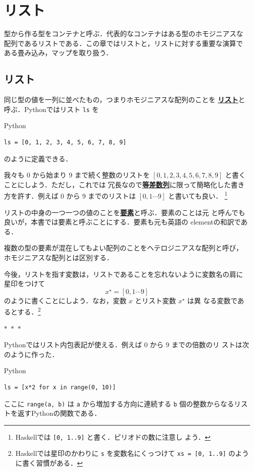 \documentclass[a5paper,twoside,fleqn,draft]{jsbook}
\newcommand{\separator}{\begin{center}$*$~$*$~$*$\end{center}}
\newcommand{\programminglanguage}[1]{\textsf{#1}}
\newcommand{\haskell}{\programminglanguage{Haskell}}
\newcommand{\python}{\programminglanguage{Python}}
\newenvironment{leader}{\begingroup\gt}{\endgroup}
\newcommand{\keyword}[1]{{\underline{\textbf{#1}}}}
\newcommand{\code}[1]{\texttt{#1}}
\newenvironment{pythoncode}{\begin{itembox}[r]{\python}}{\end{itembox}}
\newcommand{\mListWith}[1]{\left[#1\right]}
\newcommand{\mList}[1]{{#1}^\mathrm{\star}}
\begin{document}
\chapter{リスト}
\label{ch:list}

\begin{leader}
型から作る型をコンテナと呼ぶ．代表的なコンテナはある型のホモジニアスな
配列であるリストである．この章ではリストと，リストに対する重要な演算で
ある畳み込み，マップを取り扱う．
\end{leader}


\section{リスト}

同じ型の値を一列に並べたもの，つまりホモジニアスな配列のことを
\keyword{リスト}と呼ぶ．\python ではリスト \code{ls} を
\begin{pythoncode}
\begin{verbatim}
ls = [0, 1, 2, 3, 4, 5, 6, 7, 8, 9]
\end{verbatim}
\end{pythoncode}
のように定義できる．

我々も $0$ から始まり $9$ まで続く整数のリストを
$\mListWith{0,1,2,3,4,5,6,7,8,9}$ と書くことにしよう．ただし，これでは
冗長なので\keyword{等差数列}に限って簡略化した書き方を許す．例えば $0$
から $9$ までのリストは $\mListWith{0,1\dotsb9}$ と書いても良い．
\footnote{\haskell では \code{[0, 1..9]} と書く．ピリオドの数に注意し
  よう．}

リストの中身の一つ一つの値のことを\keyword{要素}と呼ぶ．要素のことは元
と呼んでも良いが，本書では要素と呼ぶことにする．要素も元も英語の
elementの和訳である．

複数の型の要素が混在してもよい配列のことをヘテロジニアスな配列と呼び，
ホモジニアスな配列とは区別する．

今後，リストを指す変数は，リストであることを忘れないように変数名の肩に
星印をつけて
\begin{equation}
\mList{x}=\mListWith{0,1\dotsb9}
\end{equation}
のように書くことにしよう．なお，変数 $x$ とリスト変数 $\mList{x}$ は異
なる変数であるとする．\footnote{\haskell では星印のかわりに \code{s}
  を変数名にくっつけて \code{xs = [0, 1..9]} のように書く習慣がある．}

\separator

\python ではリスト内包表記が使える．例えば $0$ から $9$ までの倍数のリ
ストは次のように作った．
\begin{pythoncode}
\begin{verbatim}
ls = [x*2 for x in range(0, 10)]
\end{verbatim}
\end{pythoncode}
ここに \code{range(a, b)} は \code{a} から増加する方向に連続する
\code{b} 個の整数からなるリストを返す\python の関数である．
\end{document}
